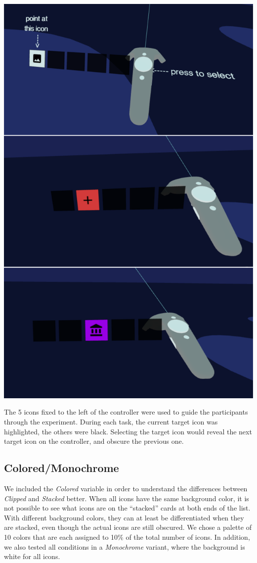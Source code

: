 \documentclass[nobib]{tufte-book} %
\begin{document}
\begin{marginfigure}
  \includegraphics[width=\linewidth]{controllers.png}
  \caption{The 5 icons fixed to the left of the controller were used to guide the participants through the experiment. During each task, the current target icon was highlighted, the others were black. Selecting the target icon would reveal the next target icon on the controller, and obscure the previous one.}
  \label{fig:controllers}
\end{marginfigure}

\subsection{Colored/Monochrome}
We included the \emph{Colored} variable in order to understand the differences between \emph{Clipped} and \emph{Stacked} better. When all icons have the same background color, it is not possible to see what icons are on the ``stacked'' cards at both ends of the list. With different background colors, they can at least be differentiated when they are stacked, even though the actual icons are still obscured. We chose a palette of 10 colors that are each assigned to 10\% of the total number of icons. In addition, we also tested all conditions in a \emph{Monochrome} variant, where the background is white for all icons.
\end{document}
